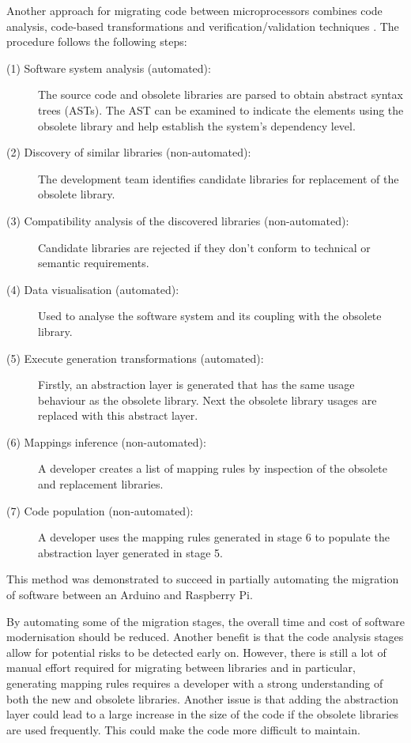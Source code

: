 \documentclass{UoYCSproject}
\begin{document}
Another approach for migrating code between microprocessors combines code analysis, code-based transformations and verification/validation techniques \parencite{gerasimou2017technical}. The procedure follows the following steps:
\begin{description}
\item[(1) Software system analysis (automated):] The source code and obsolete libraries are parsed to obtain abstract syntax trees (ASTs). The AST can be examined to indicate the elements using the obsolete library and help establish the system's dependency level.
\item[(2) Discovery of similar libraries (non-automated):] The development team identifies candidate libraries for replacement of the obsolete library.
\item[(3) Compatibility analysis of the discovered libraries (non-automated):] Candidate libraries are rejected if they don't conform to technical or semantic requirements.
\item[(4) Data visualisation (automated):] Used to analyse the software system and its coupling with the obsolete library.
\item[(5) Execute generation transformations (automated):] Firstly, an abstraction layer is generated that has the same usage behaviour as the obsolete library. Next the obsolete library usages are replaced with this abstract layer.
\item[(6) Mappings inference (non-automated):] A developer creates a list of mapping rules by inspection of the obsolete and replacement libraries.
\item[(7) Code population (non-automated):] A developer uses the mapping rules generated in stage 6 to populate the abstraction layer generated in stage 5.
\end{description}
This method was demonstrated to succeed in partially automating the migration of software between an Arduino and Raspberry Pi.

By automating some of the migration stages, the overall time and cost of software modernisation should be reduced. Another benefit is that the code analysis stages allow for potential risks to be detected early on. However, there is still a lot of manual effort required for migrating between libraries and in particular, generating mapping rules requires a developer with a strong understanding of both the new and obsolete libraries. Another issue is that adding the abstraction layer could lead to a large increase in the size of the code if the obsolete libraries are used frequently. This could make the code more difficult to maintain.
\end{document}

